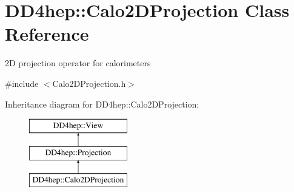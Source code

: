 \hypertarget{class_d_d4hep_1_1_calo2_d_projection}{}\section{D\+D4hep\+:\+:Calo2\+D\+Projection Class Reference}
\label{class_d_d4hep_1_1_calo2_d_projection}


2D projection operator for calorimeters  




{\ttfamily \#include $<$Calo2\+D\+Projection.\+h$>$}

Inheritance diagram for D\+D4hep\+:\+:Calo2\+D\+Projection\+:\begin{figure}[H]
\begin{center}
\leavevmode
\includegraphics[height=3.000000cm]{class_d_d4hep_1_1_calo2_d_projection}
\end{center}
\end{figure}

